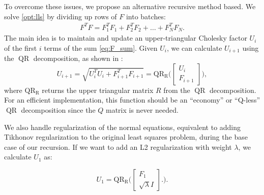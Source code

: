 \documentclass{article}
\begin{document}
To overcome these issues, we propose an alternative recursive method based. We solve
\eqref{opt:lls} by dividing up rows of $F$ into batches:
\begin{align} \label{eq:F_sum}
  F^T F = F_1^T F_1 + F_2^T F_2 + \ldots + F_N^T F_N.
\end{align}
The main idea is to maintain and update an upper-triangular Cholesky factor $U_i$ of the
first $i$ terms of the sum \eqref{eq:F_sum}. Given $U_i$, we can calculate $U_{i+1}$ using
the $\operatorname{QR}$ decomposition, as shown in
\cite{Howell2019}:
\begin{equation}
  U_{i+1} = \sqrt{U_i^TU_i + F_{i+1}^TF_{i+1}} = 
  \operatorname{QR_R}\bigg( \begin{bmatrix} {U_i} \\ {F_{i+1}} \end{bmatrix} \bigg),
\end{equation}
where $\operatorname{QR_R}$ returns the upper triangular matrix $R$ from the 
$\operatorname{QR}$ decomposition. For an efficient implementation, this function should be
an ``economy'' or ``Q-less'' $\operatorname{QR}$ decomposition 
since the $Q$ matrix is never needed.

We also handle regularization of the normal equations, equivalent to adding Tikhonov
regularization to the original least squares problem, during the base
case of our recursion. If we want to add an L2 regularization with weight $\lambda$, we
calculate $U_1$ as:

\begin{equation}
  U_1 =  \operatorname{QR_R}\bigg( 
  \begin{bmatrix} {F_1} \\ \sqrt{\lambda} I \end{bmatrix}.
  \bigg).
\end{equation}
\end{document}
